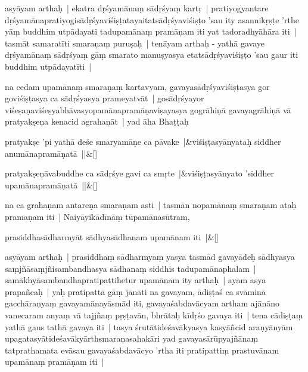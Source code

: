 \documentclass[article,12pt,a4paper]{memoir}%
\newcounter{parCount}
\begin{document}
	  
	  \pstart \leavevmode%
	\label{thakur75-98.5}asyāyam arthaḥ | ekatra dṛśyamānaṃ sādṛśyaṃ kartṛ | pratiyogyantare dṛśyamānapratiyogisādṛśyaviśiṣṭatayaitatsādṛśyaviśiṣṭo 'sau ity asannikṛṣṭe 'rthe yāṃ buddhim utpādayati tadupamānaṃ pramāṇam iti yat tadoradhyāhāra iti |\label{kāśikā1_end} tasmāt samaratīti smaraṇaṃ puruṣaḥ | tenāyam arthaḥ - yathā gavaye dṛśyamānaṃ sādṛśyaṃ gāṃ smarato manuṣyasya etatsādṛśyaviśiṣṭo 'sau gaur iti buddhim utpādayatīti |
	{}
	\pend%
      

	  
	  \pstart \leavevmode%
	\label{thakur75-98.10}na cedam upamānaṃ smaraṇaṃ kartavyam, gavayasādṛśyaviśiṣṭasya gor goviśiṣṭasya ca sādṛśyasya prameyatvāt | gosādṛśyayor viśeṣaṇaviśeṣyabhāvasyopamānapramāṇaviṣayasya gogrāhiṇā gavayagrāhiṇā vā pratyakṣeṇa kenacid agrahaṇāt | yad āha Bhaṭṭaḥ
	{}
	\pend%
      
	    
	    \stanza[\smallbreak]
	  pratyakṣe 'pi yathā deśe smaryamāṇe ca pāvake |&viśiṣṭasyānyataḥ siddher anumānapramāṇatā ||\&[\smallbreak]
	  
	  
	  
	    
	    \stanza[\smallbreak]
	  pratyakṣeṇāvabuddhe ca sādṛśye gavi ca smṛte |&viśiṣṭasyānyato 'siddher upamānapramāṇatā ||\&[\smallbreak]
	  
	  
	  

	  
	  \pstart \leavevmode%
	\label{thakur75-98.17}na ca grahaṇam antareṇa smaraṇam asti | tasmān nopamānaṃ smaraṇam ataḥ pramaṇam iti | Naiyāyikādīnāṃ tūpamānasūtram,
	{}
	\pend%
      
	    
	    \stanza[\smallbreak]
	  prasiddhasādharmyāt sādhyasādhanam upamānam iti |\&[\smallbreak]
	  
	  
	  

	  
	  \pstart \leavevmode%
	\label{thakur75-98.20}asyāyam arthaḥ | prasiddhaṃ sādharmyaṃ yasya tasmād gavayādeḥ sādhyasya saṃjñāsaṃjñisambandhasya sādhanaṃ siddhis tadupamānaphalam | samākhyāsambandhapratipattihetur upamānam ity arthaḥ | ayam asya prapañcaḥ | yaḥ pratipattā gāṃ jānāti na gavayam, ādiṣṭaś ca svāminā gacchāraṇyaṃ gavayamānayāsmād iti, gavayaśabdavācyam artham ajānāno vanecaram anyaṃ vā tajjñaṃ pṛṣṭavān, bhrātaḥ kīdṛśo gavaya iti | tena cādiṣṭaṃ yathā gaus tathā gavaya iti | tasya śrutātideśavākyasya kasyāñcid araṇyānyām upagatasyātideśavākyārthsmaraṇasahakāri yad gavayasārūpyajñānaṃ tatprathamata evāsau gavayaśabdavācyo 'rtha iti pratipattiṃ prastuvānam upamānaṃ pramāṇam iti |
	{}
	\pend%
      
\end{document}
